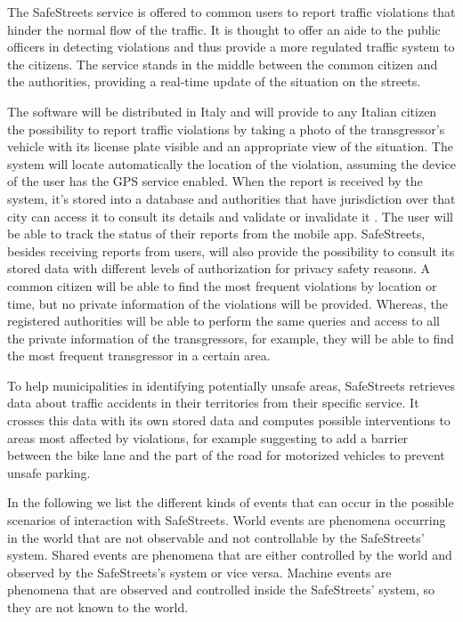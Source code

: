 The SafeStreets service is offered to common users to report traffic violations that hinder the normal flow of the traffic. It is thought to offer an aide to the public officers in detecting violations and thus provide a more regulated traffic system to the citizens. The service stands in the middle between the common citizen and the authorities, providing a real-time update of the situation on the streets.

The software will be distributed in Italy and will provide to any Italian citizen the possibility to report traffic violations by taking a photo of the transgressor's vehicle with its license plate visible and an appropriate view of the situation. The system will locate automatically the location of the violation, assuming the device of the user has the GPS service enabled. When the report is received by the system, it's stored into a database and authorities that have jurisdiction over that city can access it to consult its details and validate or invalidate it . The user will be able to track the status of their reports from the mobile app. SafeStreets, besides receiving reports from users, will also provide the possibility to consult its stored data with different levels of authorization for privacy safety reasons. A common citizen will be able to find the most frequent violations by location or time, but no private information of the violations will be provided. Whereas, the registered authorities will be able to perform the same queries and access to all the private information of the transgressors, for example, they will be able to find the most frequent transgressor in a certain area.

To help municipalities in identifying potentially unsafe areas, SafeStreets retrieves data about traffic accidents in their territories from their specific service. It crosses this data with its own stored data and computes possible interventions to areas most affected by violations, for example suggesting to add a barrier between the bike lane and the part of the road for motorized vehicles to prevent unsafe parking.

In the following we list the different kinds of events that can occur in the possible scenarios of interaction with SafeStreets. World events are phenomena occurring in the world that are not observable and not controllable by the SafeStreets' system. Shared events are phenomena that are either controlled by the world and observed by the SafeStreets's system or vice versa. Machine events are phenomena that are observed and controlled inside the SafeStreets' system, so they are not known to the world.

